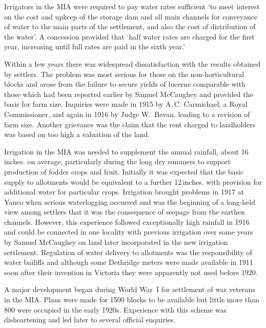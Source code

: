 Irrigators in the MIA were required to pay water rates sufficient `to
meet interest on the cost and upkeep of the storage dam and all main
channels for conveyance of water to the main parts of the settlement,
and also the cost of distribution of the water'. A concession provided
that `half water rates are charged for the first year, increasing
until full rates are paid in the sixth year.'

Within a few years there was widespread dissatisfaction with the
results obtained by settlers.  The problem was most serious for those
on the non-horticultural blocks and arose from the failure to secure
yields of lucerne comparable with those which had been reported
earlier by Samuel McCaughey and provided the basis for farm size.
Inquiries were made in 1915 by A.\,C. Carmichael, a Royal
Commissioner, and again in 1916 by Judge W.~Bevan, leading to a
revision of farm size.  Another grievance was the claim that the rent
charged to landholders was based on too high a valuation of the
land.

Irrigation in the MIA was needed to supplement the annual rainfall,
about 16\,inches. on average, particularly during the long dry summers
to support production of fodder crops and fruit.  Initially it was
expected that the basic supply to allotments would be equivalent to a
further 12\,inches. with provision for additional water for particular
crops. Irrigation brought problems in 1917 at Yanco when serious
waterlogging  occurred and was the beginning of a
long-held view among settlers that it was the consequence of seepage
from the earthen channels.  However, this experience followed
exceptionally high rainfall in 1916 and could be connected in one
locality with previous irrigation over some years by Samuel McCaughey
on land later incorporated in the new irrigation settlement.
Regulation of water delivery to allotments was the responsibility of
water bailiffs and although some Dethridge meters
 were made available
in 1911 soon after their invention in Victoria they were apparently
not used before 1920.

A major development began during World War~I for settlement of war
veterans in the MIA.  Plans were made for 1500 blocks to be available
but little more than 800 were occupied in the early 1920s.  Experience
with this scheme was disheartening and led later to several official
enquiries.

